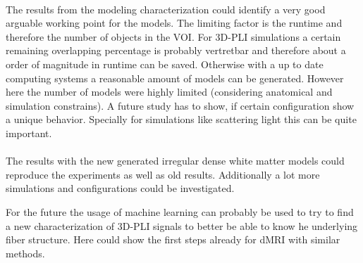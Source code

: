 \paragraph{}
The results from the modeling characterization could identify a very good arguable working point for the models.
The limiting factor is the runtime and therefore the number of objects in the \ac{VOI}.
For \ac{3D-PLI} simulations a certain remaining overlapping percentage is probably vertretbar and therefore about a order of magnitude in runtime can be saved.
Otherwise with a up to date computing systems a reasonable amount of models can be generated.
However here the number of models were highly limited (considering anatomical and simulation constrains).
A future study has to show, if certain configuration show a unique behavior.
Specially for simulations like scattering light this can be quite important.
% 
% 
% 
\paragraph{}
The results with the new generated irregular dense white matter models could reproduce the experiments as well as old results.
Additionally a lot more simulations and configurations could be investigated.
\par
For the future the usage of machine learning can probably be used to try to find a new characterization of \ac{3D-PLI} signals to better be able to know he underlying fiber structure.
Here \cite{ginsburgerDis2019} could show the first steps already for \ac{dMRI} with similar methods. 